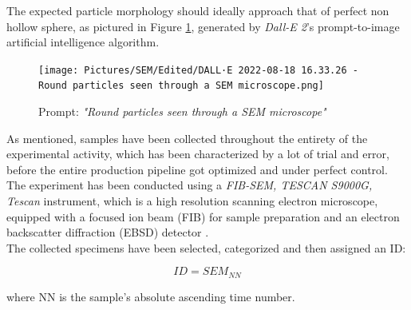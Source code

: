 \documentclass{article}
\begin{document}
        The expected particle morphology should ideally approach that of perfect non hollow sphere, as pictured in Figure \ref{fig:SEM_DALLE2}, generated by \textit{Dall-E 2}'s 
        prompt-to-image artificial intelligence algorithm. 

            \begin{figure}[ht]
                \centering
                \texttt{[image: Pictures/SEM/Edited/DALL·E 2022-08-18 16.33.26 - Round particles seen through a SEM microscope.png]}
                \caption{Prompt: \textit{"Round particles seen through a SEM microscope"}}
                \label{fig:SEM_DALLE2}
            \end{figure}

            \clearpage

            As mentioned, samples have been collected throughout the entirety of the experimental activity, which has been characterized by a lot of trial and error, 
            before the entire production pipeline got optimized and 
            under perfect control. \\ 

            The experiment has been conducted using a \textit{FIB-SEM, TESCAN S9000G, Tescan} instrument, which is a high resolution 
            scanning electron microscope, equipped with a focused ion beam (FIB) for sample preparation and 
            an electron backscatter diffraction (EBSD) detector \autocites{FIB-SEM_TESCAN_S9000G}. \\

            The collected specimens have been selected, categorized and then assigned an ID:

            \begin{equation}
                ID = SEM_{NN}
                \label{eq:SEM_ID}
            \end{equation}

            where NN is the sample's absolute ascending time number. \\ 


\end{document}
